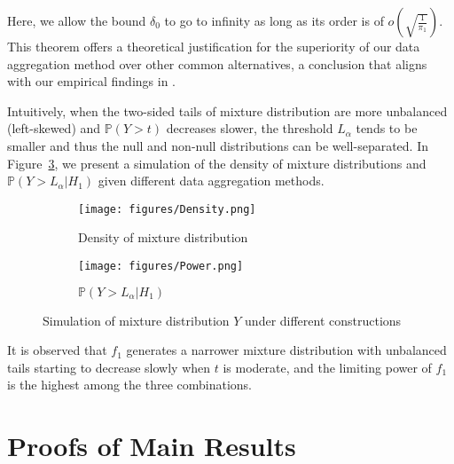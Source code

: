 \documentclass[12pt]{article}
\newcommand{\PP}{\mathbb{P}}
\def\PP{{\mathbb P}}
\theoremstyle{plain}
\begin{document}
Here, we allow the bound $\delta_0$ to go to infinity as long as its order is of $o(\sqrt{\frac{1}{\pi_1}})$. This theorem offers a theoretical justification for the superiority of our data aggregation method over other common alternatives, a conclusion that aligns with our empirical findings in \cite{dai2023scale,du2021false}.




Intuitively, when the two-sided tails of mixture distribution are more unbalanced (left-skewed) and $\PP(Y>t)$ decreases slower, the threshold $L_\alpha$ tends to be smaller and thus the null and non-null distributions can be well-separated. In Figure~\ref{fig:c0}, we present a simulation of the density of mixture distributions and $\PP(Y>L_\alpha|H_1)$ given different data aggregation methods.

\begin{figure}
	\centering
	\begin{subfigure}{0.45\textwidth}
		\texttt{[image: figures/Density.png]}
		\caption{Density of mixture distribution}
		\label{fig:c1}
	\end{subfigure}
	\begin{subfigure}{0.45\textwidth}
		\texttt{[image: figures/Power.png]}
		\caption{$\PP(Y>L_\alpha|H_1)$ }
		\label{fig:c2}
	\end{subfigure}
	\caption{Simulation of mixture distribution $Y$ under different constructions}
	\label{fig:c0}
\end{figure}
It is observed that $f_1$ generates a narrower mixture distribution with unbalanced tails starting to decrease slowly when $t$ is moderate, and the limiting power of $f_1$ is the highest among the three combinations.


\section{Proofs of Main Results}
\end{document}
